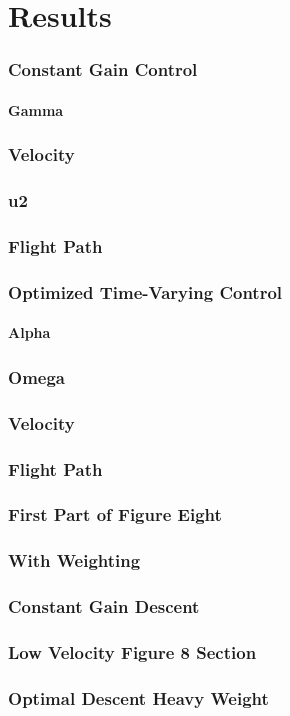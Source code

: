 \documentclass{beamer}
\begin{document}
    \section{Results}
    \begin{frame}
        \frametitle{Constant Gain Control}
        \framesubtitle{Gamma}
    \end{frame}

    \begin{frame}
        \frametitle{Velocity}
    \end{frame}
    \begin{frame}
        \frametitle{u2}
    \end{frame}
    \begin{frame}
        \frametitle{Flight Path}
    \end{frame}



    \begin{frame}
        \frametitle{Optimized Time-Varying Control}
        \framesubtitle{Alpha}
    \end{frame}
    
    \begin{frame}
        \frametitle{Omega}
    \end{frame}

    \begin{frame}
        \frametitle{Velocity}
    \end{frame}
    
    \begin{frame}
        \frametitle{Flight Path}
    \end{frame}
    
    \begin{frame}
        \frametitle{First Part of Figure Eight}
    \end{frame}
    \begin{frame}
        \frametitle{With Weighting}
    \end{frame}
    \begin{frame}
        \frametitle{Constant Gain Descent}
    \end{frame}
    \begin{frame}
        \frametitle{Low Velocity Figure 8 Section}
    \end{frame}

    \begin{frame}
        \frametitle{Optimal Descent Heavy Weight}
    \end{frame}
\end{document}

